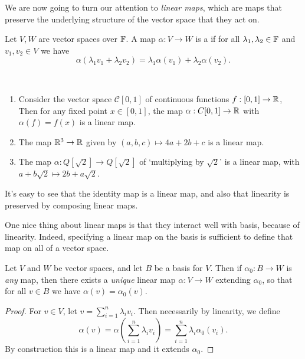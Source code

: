 \documentclass[a4paper]{scrartcl}
\begin{document}
We are now going to turn our attention to \emph{linear maps}, which are maps that preserve the underlying structure of the vector space that they act on.

\begin{definition}
    Let $V, W$ are vector spaces over $\mathbb{F}$.
    A map $\alpha: V \rightarrow W$ is a  if for all $\lambda_1, \lambda_2 \in \mathbb{F}$ and $v_1, v_2 \in V$ we have 
    $$
    \alpha(\lambda_1 v_1 + \lambda_2 v_2) = \lambda_1\alpha(v_1) + \lambda_2 \alpha(v_2).
    $$
\end{definition}

\begin{example}~
    \vspace{-1.5\baselineskip}
    \begin{enumerate}[label=(\roman*)]
        \item Consider the vector space $\mathcal{C}[0, 1]$ of continuous functions $f:[0, 1] \rightarrow \mathbb{R}$, Then for any fixed point $x \in [0, 1]$, the map $\alpha: C[0, 1] \rightarrow \mathbb{R}$ with $\alpha(f) = f(x)$ is a linear map.
        \item The map $\mathbb{R}^3 \rightarrow \mathbb{R}$ given by $(a, b, c) \mapsto 4a + 2b + c$ is a linear map.
        \item The map $\alpha: Q[\sqrt{2}] \rightarrow Q[\sqrt{2}]$ of `multiplying by $\sqrt{2}$' is a linear map, with $a + b \sqrt{2} \mapsto 2b + a \sqrt{2}$.
    \end{enumerate}
\end{example}

It's easy to see that the identity map is a linear map, and also that linearity is preserved by composing linear maps.

One nice thing about linear maps is that they interact well with basis, because of linearity. Indeed, specifying a linear map on the basis is sufficient to define that map on all of a vector space.

\begin{lemma}\label{lemma:extend-map}
    Let $V$ and $W$ be vector spaces, and let $B$ be a basis for $V$. Then if $\alpha_0: B \rightarrow W$ is \emph{any} map, then there exists a \emph{unique} linear map $\alpha: V \rightarrow W$ extending $\alpha_0$, so that for all $v \in B$ we have $\alpha(v) = \alpha_0(v)$.
\end{lemma}
\begin{proof}
    For $v \in V$, let $v = \sum_{i = 1}^n \lambda_i v_i$. Then necessarily by linearity, we define
    $$
    \alpha(v) = \alpha\left(\sum_{i = 1}^n \lambda_i v_i\right) = \sum_{i = 1}^n \lambda_i \alpha_0 (v_i).
    $$
    By construction this is a linear map and it extends $\alpha_0$.
\end{proof}
\end{document}
